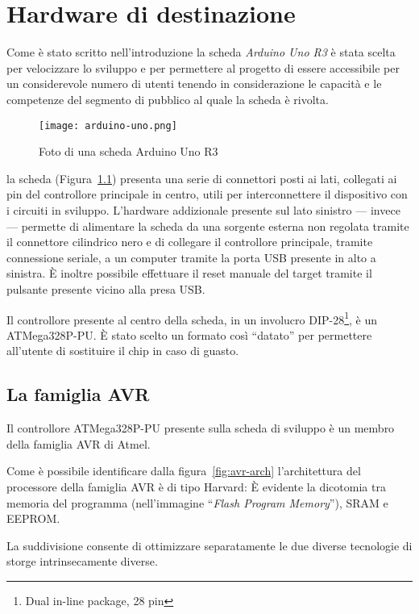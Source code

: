\chapter{Hardware di destinazione}
    
Come è stato scritto nell'introduzione la scheda \textit{Arduino Uno R3} è stata scelta per velocizzare lo sviluppo e per permettere al progetto di essere accessibile per un considerevole numero di utenti tenendo in considerazione le capacità e le competenze del segmento di pubblico al quale la scheda è rivolta.

\begin{figure}[b]
    \centering
    \texttt{[image: arduino-uno.png]}
    \caption[]{Foto di una scheda Arduino Uno R3\cite{img:arduino-uno-r3}}\label{fig:arduino-uno-r3}
\end{figure}

la scheda (Figura~\ref{fig:arduino-uno-r3}) presenta una serie di connettori posti ai lati, collegati ai pin del controllore principale in centro, utili per interconnettere il dispositivo con i circuiti in sviluppo.
L'hardware addizionale presente sul lato sinistro --- invece --- permette di alimentare la scheda da una sorgente esterna non regolata tramite il connettore cilindrico nero e di collegare il controllore principale, tramite connessione seriale, a un computer tramite la porta USB presente in alto a sinistra.
È inoltre possibile effettuare il reset manuale del target tramite il pulsante presente vicino alla presa USB.

Il controllore presente al centro della scheda, in un involucro DIP-28\footnote{Dual in-line package, 28 pin}, è un ATMega328P-PU\cite{site:arduino-uno-doc}. È stato scelto un formato così ``datato'' per permettere all'utente di sostituire il chip in caso di guasto.

\section{La famiglia AVR}

Il controllore ATMega328P-PU presente sulla scheda di sviluppo è un membro della famiglia AVR di Atmel\cite{avr:m328p}.

Come è possibile identificare dalla figura~\ref{fig:avr-arch} l'architettura del processore della famiglia AVR è di tipo Harvard: È evidente la dicotomia tra memoria del programma (nell'immagine ``\textit{Flash Program Memory}''), SRAM e EEPROM\cite{harvard-arch}.

La suddivisione consente di ottimizzare separatamente le due diverse tecnologie di storge intrinsecamente diverse.

